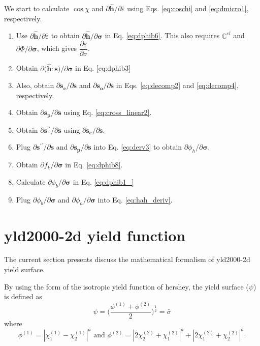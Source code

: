 \documentclass[12pt]{amsart}
\begin{document}
We start to calculate $\cos\chi$ and $\partial \hat{\mathbf{h}}/\partial \bar{\varepsilon}$ using Eqs. \ref{eq:coschi} and \ref{eq:dmicro1}, respectively.
\begin{enumerate}
\item Use $\partial \hat{\mathbf{h}}/\partial \bar{\varepsilon}$ to obtain $\partial \hat{\mathbf{h}}/\partial \mathbf{\sigma}$ in Eq. \ref{eq:dphib6}. This also requires $\mathbb{C}^{el}$ and $\partial\Phi/\partial\mathbf{\sigma}$, which gives $\dfrac{\partial\bar{\varepsilon}}{\partial\sigma}$.
\item Obtain $\partial\big(\hat{\mathbf{h}}:\mathbf{s}\big)/\partial \mathbf{\sigma}$ in Eq. \ref{eq:dphib3}
\item Also, obtain $\partial \mathbf{s_c}/\partial \mathbf{s}$ and $\partial \mathbf{s_o}/\partial\mathbf{s}$ in Eqs. \ref{eq:decomp2} and \ref{eq:decomp4}, respectively.
\item Obtain $\partial \mathbf{s_p}/\partial\mathbf{s}$ using Eq. \ref{eq:cross_linear2}.
\item Obtain $\partial\mathbf{s}^{\prime\prime}/\partial\mathbf{s}$ using $\partial \mathbf{s_c}/\partial \mathbf{s}$.
\item Plug $\partial\mathbf{s}^{\prime\prime}/\partial\mathbf{s}$ and  $\partial \mathbf{s_p}/\partial\mathbf{s}$ into Eq. \ref{eq:derv3} to obtain $\partial\phi_h/\partial\mathbf{\sigma}$.
\item Obtain $\partial f_k/\partial \mathbf{\sigma}$ in Eq. \ref{eq:dphib8}.
\item Calculate $\partial \phi_b/\partial \mathbf{\sigma}$ in Eq. \ref{eq:dphib1_}
\item Plug $\partial \phi_b/\partial\mathbf{\sigma}$ and $\partial\phi_h/\partial\mathbf{\sigma}$ into Eq. \ref{eq:hah_deriv}.
\end{enumerate}
\newpage
\section{yld2000-2d yield function}
The current section presents discuss the mathematical formalism of yld2000-2d yield surface.

By using the form of the isotropic yield function of hershey, the yield surface ($\psi$) is defined as
\begin{equation}
  \label{eq:hershey}
  \psi=\bigg(\frac{\phi^{(1)} + \phi^{(2)}}{2}\bigg)^{\frac{1}{a}}=\bar{\sigma}
\end{equation}
where
\begin{equation}
  \label{eq:hershey2}
  \phi^{(1)} = |\chi^{(1)}_1-\chi^{(1)}_2|^a \text{ and } \phi^{(2)}=|2\chi^{(2)}_2+\chi^{(2)}_1|^a+|2\chi^{(2)}_1+\chi^{(2)}_2|^a.
\end{equation}
\end{document}

